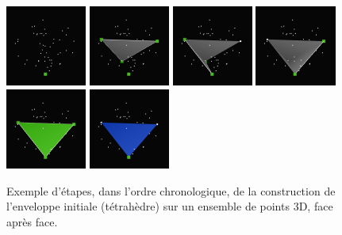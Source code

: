 \documentclass[]{article}
\begin{document}
\begin{figure}[H]
	\begin{center}
		\includegraphics[width=2.65cm]{qh3d/demo3d/init_6.png}
		\includegraphics[width=2.65cm]{qh3d/demo3d/init_5.png}
		\includegraphics[width=2.65cm]{qh3d/demo3d/init_4.png}
		\includegraphics[width=2.65cm]{qh3d/demo3d/init_3.png}
		\includegraphics[width=2.65cm]{qh3d/demo3d/init_2.png}
		\includegraphics[width=2.65cm]{qh3d/demo3d/init_1.png}
	\end{center}
	\caption{Exemple d'étapes, dans l'ordre chronologique, de la construction de l'enveloppe initiale (tétrahèdre) sur un ensemble de points 3D, face après face.}
\end{figure}
\end{document}
